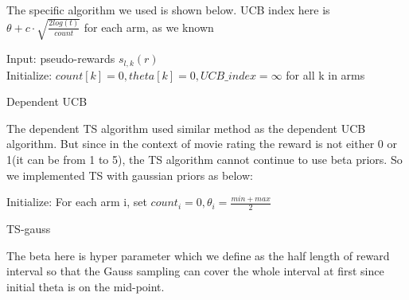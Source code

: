 \documentclass{article}
\begin{document}
\begin{homeworkProblem}
\begin{enumerate}
\begin{enumerate}[a.]
        \end{enumerate}
        The specific algorithm we used is shown below. UCB index here is $\theta+c\cdot \sqrt{\frac{2log(t)}{count}}$ for each arm, as we known\\
        \begin{algorithm}[H]
            \SetAlgoLined
            Input: pseudo-rewards $s_{l,k}(r)$\\
            Initialize: $count[k] = 0, theta[k] =0, UCB\_index=\infty $ for all k in arms\\
            \caption{Dependent UCB}
          \end{algorithm}
          The dependent TS algorithm used similar method as the dependent UCB algorithm. But since in the context of movie rating the reward is not either 0 or 1(it can be from 1 to 5), the TS algorithm cannot continue to use beta priors. So we implemented TS with gaussian priors as below:\\
          \begin{algorithm}[H]
            \SetAlgoLined
            Initialize: For each arm i, set $count_i = 0, \theta_i = \frac{min + max}{2}$\\
            \caption{TS-gauss\cite{ref4}}
          \end{algorithm}
          The beta here is hyper parameter which we define as the half length of reward interval so that the Gauss sampling can cover the whole interval at first since initial theta is on the mid-point.
          

\end{enumerate}
\end{homeworkProblem}
\end{document}
